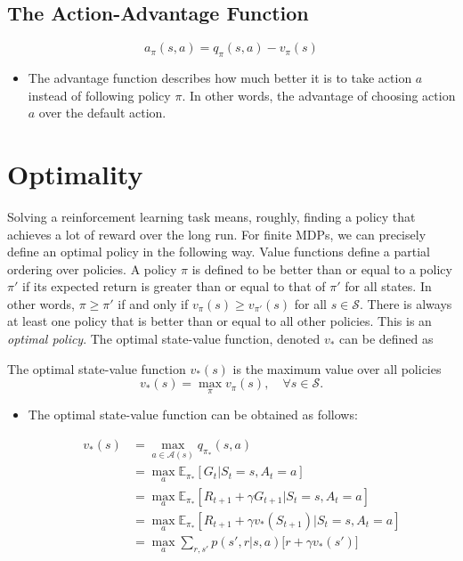 \subsection{The Action-Advantage Function}

\begin{definition}
	$$a_{\pi}(s,a) = q_\pi(s,a)-v_\pi(s)$$
\end{definition}

\begin{itemize}
	\item The advantage function describes how much better it is to take action $a$ instead of following policy $\pi$. In other words, the advantage of choosing action $a$ over the default action.
\end{itemize}

\section{Optimality}

Solving a reinforcement learning task means, roughly, finding a policy that achieves a lot of reward over the long run. For finite MDPs, we can precisely define an optimal policy in the following way. Value functions define a partial ordering over policies. A policy $\pi$ is defined to be better than or equal to a policy $\pi'$ if its expected return is greater than or equal to that of $\pi'$ for all states. In other words, $\pi\geq \pi'$ if and only if $v_\pi(s)\geq v_{\pi'}(s)$ for all $s\in \mathcal{S}$. There is always at least one policy that is better than or equal to all other policies. This is an \textit{optimal policy}. The optimal state-value function, denoted $v_*$ can be defined as 


\begin{definition}
	The optimal state-value function $v_{*}(s)$ is the maximum value over all policies
	$$v_{*}(s) = \max_{\pi} v_{\pi}(s),\quad \forall s\in \mathcal{S}.$$
\end{definition}

\begin{itemize}
	\item The optimal state-value function can be obtained as follows:

		\begin{align*}
			v_*(s) &= \max_{a\in \mathcal{A}(s)}q_{\pi_*}(s,a)\\
			&= \max_a \mathbb{E}_{\pi_*}[G_t| S_t=s, A_t=a]\\
			&= \max_a \mathbb{E}_{\pi_*}[R_{t+1}+\gamma G_{t+1}| S_t=s, A_t=a]\\
			&= \max_a \mathbb{E}_{\pi_*}[R_{t+1}+\gamma v_*(S_{t+1})| S_t=s, A_t=a]\\
			&= \max_a \sum_{r,s'}p(s',r|s,a)\Big[r + \gamma  v_*(s')\Big] 
	\end{align*}

\end{itemize}


